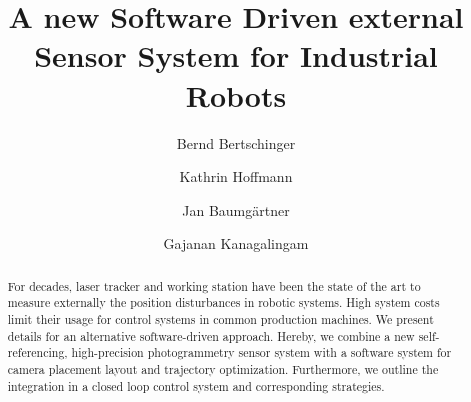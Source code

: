 \documentclass[5p,times,procedia]{elsarticle}
\begin{document}
\begin{frontmatter}



%

\title{A new Software Driven external Sensor System for Industrial Robots}


\author[a]{Bernd Bertschinger\corref{*}} 
\author[b]{Kathrin Hoffmann}
\author[c]{Jan Baumgärtner}
\author[b]{Gajanan Kanagalingam}

\address[a]{Institute of Applied Optics, University of Stuttgart - ITO, Pfaffenwaldring 9, 70569 Stuttgart, Germany}
\address[b]{Institute for System Dynamics, University of Stuttgart - ISYS, Waldburgstr. 17/19, 70563 Stuttgart, Germany}
\address[c]{Institute of Production Science, Karlsruhe Institute of Technology - WBK, Kaiserstraße 12, 76131 Karlsruhe, Germany}


\begin{abstract}
For decades, laser tracker and working station have been the state of the art to measure externally the position disturbances in robotic systems. High system costs limit their usage for control systems in common production machines. We present details for an alternative software-driven approach. Hereby, we combine a new self-referencing, high-precision photogrammetry sensor system with a software system for camera placement layout and trajectory optimization. Furthermore, we outline the integration in a closed loop control system and corresponding strategies.
\end{abstract}


\end{frontmatter}
\end{document}
